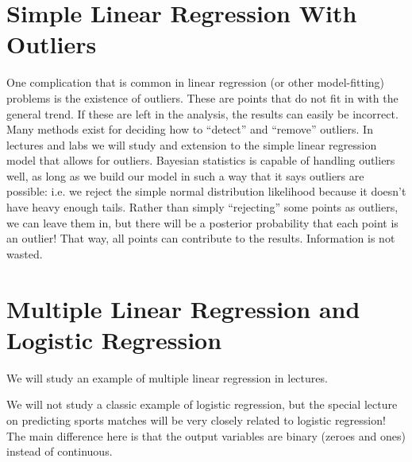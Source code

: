 \section{Simple Linear Regression With Outliers}
One complication that is common in linear regression (or other model-fitting)
problems is the existence of outliers. These are points that do not fit in with
the general trend. If these are left in the analysis, the results can easily
be incorrect. Many methods exist for deciding how to ``detect'' and ``remove''
outliers. In lectures and labs we will study and extension to the simple linear
regression model that allows for outliers. Bayesian statistics is capable of
handling outliers well, as long as we build our model in such a way that it says
outliers are possible: i.e. we reject the simple normal distribution likelihood
because it doesn't have heavy enough tails.
Rather than simply ``rejecting'' some
points as outliers, we can leave them in, but there will be a posterior probability
that each point is an outlier! That way, all points can contribute to the results.
Information is not wasted.

\section{Multiple Linear Regression and Logistic Regression}
We will study an example of multiple linear regression in lectures.

We will not study a classic example of logistic regression, but the special
lecture on predicting sports matches will be very closely related to logistic
regression! The main difference here is that the output variables are binary
(zeroes and ones) instead of continuous.
